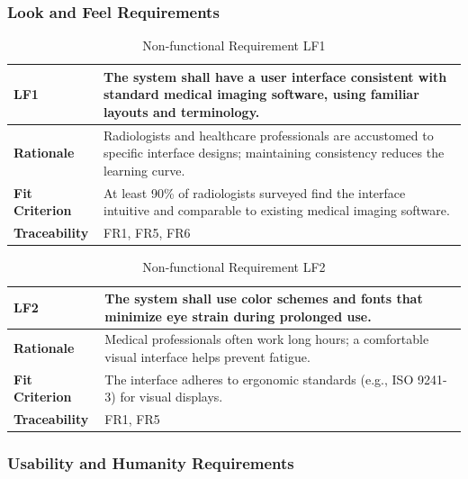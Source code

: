 \documentclass[12pt]{article}
\begin{document}
\subsubsection{Look and Feel Requirements}

\begin{table}[h!]
\centering
{}
\begin{tabular}{|p{3.5cm}|p{11.5cm}|}
\hline
\rowcolor{gray!30}
\textbf{LF1} & The system shall have a user interface consistent with standard medical imaging software, using familiar layouts and terminology. \\
\hline
\textbf{Rationale} & Radiologists and healthcare professionals are accustomed to specific interface designs; maintaining consistency reduces the learning curve. \\
\hline
\textbf{Fit Criterion} & At least 90\% of radiologists surveyed find the interface intuitive and comparable to existing medical imaging software. \\
\hline
\textbf{Traceability} & FR1, FR5, FR6 \\
\hline
\end{tabular}
\caption{Non-functional Requirement LF1}
\end{table}

\begin{table}[h!]
\centering
{}
\begin{tabular}{|p{3.5cm}|p{11.5cm}|}
\hline
\rowcolor{gray!30}
\textbf{LF2} & The system shall use color schemes and fonts that minimize eye strain during prolonged use. \\
\hline
\textbf{Rationale} & Medical professionals often work long hours; a comfortable visual interface helps prevent fatigue. \\
\hline
\textbf{Fit Criterion} & The interface adheres to ergonomic standards (e.g., ISO 9241-3) for visual displays. \\
\hline
\textbf{Traceability} & FR1, FR5 \\
\hline
\end{tabular}
\caption{Non-functional Requirement LF2}
\end{table}

\subsubsection{Usability and Humanity Requirements}
\end{document}

